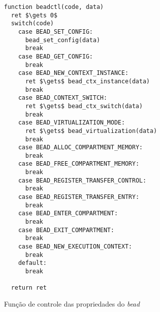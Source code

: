 \begin{pseudocode}

\begin{lstlisting}[language=pseudocode, style=pseudocode]
function beadctl(code, data)
  ret $\gets 0$
  switch(code)
    case BEAD_SET_CONFIG:
      bead_set_config(data)
      break
    case BEAD_GET_CONFIG:
      break
    case BEAD_NEW_CONTEXT_INSTANCE:
      ret $\gets$ bead_ctx_instance(data)
      break
    case BEAD_CONTEXT_SWITCH:
      ret $\gets$ bead_ctx_switch(data)
      break
    case BEAD_VIRTUALIZATION_MODE:
      ret $\gets$ bead_virtualization(data)
      break
    case BEAD_ALLOC_COMPARTMENT_MEMORY:
      break
    case BEAD_FREE_COMPARTMENT_MEMORY:
      break
    case BEAD_REGISTER_TRANSFER_CONTROL:
      break
    case BEAD_REGISTER_TRANSFER_ENTRY:
      break
    case BEAD_ENTER_COMPARTMENT:
      break
    case BEAD_EXIT_COMPARTMENT:
      break
    case BEAD_NEW_EXECUTION_CONTEXT:
      break
    default:
      break

  return ret

\end{lstlisting}

  \label{alg:ctlbead}
  \caption{Função de controle das propriedades do \emph{bead}}
\end{pseudocode}
